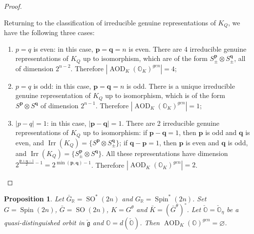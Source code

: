 \documentclass[11pt, a4paper]{amsart}
\newcommand{\orb}{\mathbb{O}}
\newcommand{\orbk}{\orb_{K}}
\newcommand{\fg}{\mathfrak{g}}
\newcommand{\ckfg}{{\check{\fg}}}
\newcommand{\ckorb}{\check{\orb}}
\DeclareMathOperator{\AOD}{AOD}
\newcommand{\AODK}{\AOD_K}
\newcommand{\SO}{\operatorname{SO}}
\newcommand{\Spin}{\operatorname{Spin}}
\newcommand{\R}{\mathbb{R}}
\newcommand{\Irr}{\operatorname{Irr}}
\newtheorem{Prop}[Thm]{Proposition}
\theoremstyle{definition}
\numberwithin{equation}{section}
\begin{document}
\begin{proof}
\begin{itemize}[itemindent=*, leftmargin=*]
	\end{itemize}
	Returning to the classification of irreducible genuine representations of $K_Q$, we have the following three cases:
	\begin{enumerate}[label=(\roman*), itemindent=*, leftmargin=*]
		\item $p=q$ is even: in this case, $\mathbf{p} = \mathbf{q} = n$ is even. There are 4 irreducible genuine representations of $K_Q$ up to isomorphism, which are of the form $S_{\pm}^{\mathbf{p}} \otimes S_{\pm}^{\mathbf{q}}$, all of dimension $2^{n-2}$. Therefore $|\AODK(\orbk)^{gen}| = 4$;
		\item $p=q$ is odd: in this case, $\mathbf{p} = \mathbf{q} = n$ is odd. There is a unique irreducible genuine representation of $K_Q$ up to isomorphism, which is of the form $S^{\mathbf{p}} \otimes S^{\mathbf{q}}$ of dimension $2^{n-1}$. Therefore $|\AODK(\orbk)^{gen}| = 1$;
		\item $|p-q|=1$: in this case, $|\mathbf{p} - \mathbf{q}| = 1$. There are 2 irreducible genuine representations of $K_Q$ up to isomorphism: if $\mathbf{p} - \mathbf{q} = 1$, then $\mathbf{p}$ is odd and $\mathbf{q}$ is even, and $\Irr(K_Q) = \{S^{\mathbf{p}} \otimes S_{\pm}^{\mathbf{q}}\}$; if $\mathbf{q} - \mathbf{p} = 1$, then $\mathbf{p}$ is even and $\mathbf{q}$ is odd, and $\Irr(K_Q) = \{S_{\pm}^{\mathbf{p}} \otimes S^{\mathbf{q}}\}$.  
		All these representations have dimension $2^{\frac{\mathbf{p}+\mathbf{q}-1}{2}-1} = 2^{\min(\mathbf{p}, \mathbf{q})-1}$. Therefore $|\AODK(\orbk)^{gen}| = 2$.
	\end{enumerate}
\end{proof}

\begin{Prop} \label{prop:adm_SO*(2n)}
	Let $\bar{G}_\R = \SO^*(2n)$ and $G_\R = \Spin^*(2n)$. Set $G = \Spin(2n)$, $\bar{G} = \SO(2n)$, $K = G^\theta$ and $\bar{K} = (\bar{G}^\theta)^\circ$. Let $\ckorb = \ckorb_\eta$ be a quasi-distinguished orbit in $\ckfg$ and $\orb = d(\ckorb)$. Then $\AODK(\orb)^{gen} = \varnothing$.
\end{Prop}
\end{document}
